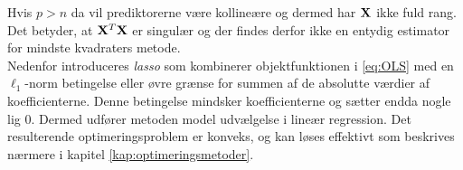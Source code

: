 Hvis \(p > n\) da vil prediktorerne være kollineære og dermed har \(\mathbf{X}\) ikke fuld rang.
Det betyder, at $\mathbf{X}^T \mathbf{X}$ er singulær og der findes derfor ikke en entydig estimator for mindste kvadraters metode. \\[4mm]
%
Nedenfor introduceres \textit{lasso} som kombinerer objektfunktionen i \eqref{eq:OLS} med en $\ell_1$-norm betingelse eller øvre grænse for summen af de absolutte værdier af koefficienterne.
Denne betingelse mindsker koefficienterne og sætter endda nogle lig 0. 
Dermed udfører metoden model udvælgelse i lineær regression.
Det resulterende optimeringsproblem er konveks, og kan løses effektivt som beskrives nærmere i kapitel \ref{kap:optimeringsmetoder}.


%






